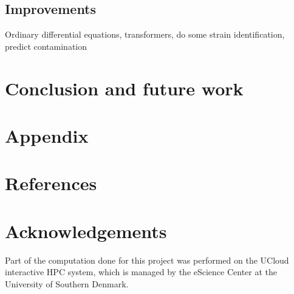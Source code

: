 \documentclass[a4paper,12pt]{article}
\begin{document}
\subsection{Improvements}
Ordinary differential equations, transformers, do some strain identification, predict contamination
\section{Conclusion and future work}




\section{Appendix}



\section{References}



\section{Acknowledgements}
Part of the computation done for this project was performed on the UCloud interactive HPC system, which is managed by the eScience Center at the University of Southern Denmark.



\end{document}
